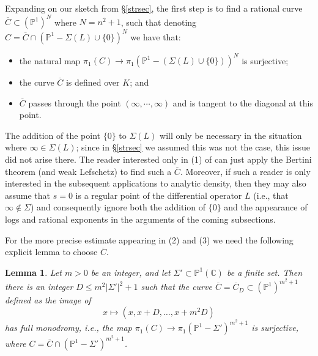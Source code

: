 \documentclass[10pt]{article}
\numberwithin{equation}{section}
\theoremstyle{plain}
\newtheorem{lem}[thm]{Lemma}
\theoremstyle{definition}
\theoremstyle{remark}
\newcommand{\C}{\mathbb{C}}
\newcommand{\PP}{\mathbb{P}}
\begin{document}
Expanding on our sketch from \S\ref{strsec}, the first step is to find a rational curve $\overline{C} \subset (\PP^1)^{N}$ where $N = n^2 + 1$, such that denoting $C = \overline{C} \cap (\PP^1 - \Sigma(L)\cup\{0\})^N$ we have that:
\begin{itemize}
    \item[(a)] the natural map $\pi_1(C) \to \pi_1(\PP^1 - (\Sigma(L)\cup\{0\}))^N$ is surjective;
    \item[(b)] the curve $\overline{C}$ is defined over $K$; and
    \item[(c)] $\overline{C}$ passes through the point $(\infty, \cdots, \infty)$ and is tangent to the diagonal at this point.
\end{itemize}
The addition of the point $\{ 0 \}$ to $\Sigma(L)$ will only be necessary in the situation where $\infty \in \Sigma(L)$; since in \S\ref{strsec} we assumed this was not the case, this issue did not arise there. The reader interested only in (1) of  can just apply the Bertini theorem (and weak Lefschetz) to find such a $\overline{C}$. Moreover, if such a reader is only interested in the subsequent applications to analytic density, then they may also assume that $s = 0$ is a regular point of the differential operator $L$ (i.e., that $\infty \notin \Sigma$) and consequently ignore both the addition of $\{ 0 \}$ and the appearance of logs and rational exponents in the arguments of the coming subsections.


For the more precise estimate appearing in (2) and (3) we need the following explicit lemma to choose $\overline{C}$.
\begin{lem}\label{lemmashift}
Let $m > 0$ be an integer, and let $\Sigma' \subset \PP^1(\C)$ be a finite set. Then there is an integer $D \leq m^2 |\Sigma'|^2 + 1$ such that the curve $\overline{C} = \overline{C}_D \subset (\PP^1 )^{m^2+1}$ defined as the image of
\begin{displaymath}
     x \mapsto (x, x+D, \dots, x+m^2D)
\end{displaymath}
has full monodromy, i.e., the map $\pi_1(C) \to \pi_1(\PP^1 - \Sigma')^{m^2 + 1}$ is surjective, where $C = \overline{C} \cap (\PP^1 - \Sigma')^{m^2 + 1}$.
\end{lem}
\end{document}
